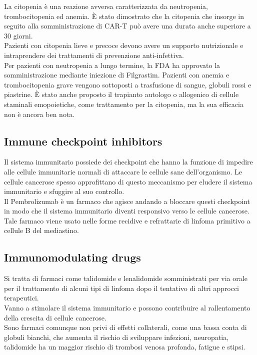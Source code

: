 La citopenia è una reazione avversa caratterizzata da neutropenia, trombocitopenia ed anemia. 
È stato dimostrato che la citopenia che insorge in seguito alla somministrazione di CAR-T può avere una durata anche 
superiore a 30 giorni\cite{Frontiers}.\\ 
Pazienti con citopenia lieve e precoce devono avere un supporto nutrizionale e intraprendere dei trattamenti di 
prevenzione anti-infettiva.\\ 
Per pazienti con neutropenia a lungo termine, la FDA ha approvato la somministrazione mediante iniezione di Filgrastim. 
Pazienti con anemia e trombocitopenia grave vengono sottoposti a trasfusione di sangue, globuli rossi e piastrine. 
È stato anche proposto il trapianto autologo o allogenico di cellule staminali emopoietiche, come trattamento per 
la citopenia, ma la sua efficacia non è ancora ben nota\cite{Frontiers}.\\

\subsection{Immune checkpoint inhibitors}

Il sistema immunitario possiede dei checkpoint che hanno la funzione di impedire alle cellule immunitarie normali di 
attaccare le cellule sane dell’organismo. Le cellule cancerose spesso approfittano di questo meccanismo per eludere il 
sistema immunitario e sfuggire al suo controllo.\\ 
Il Pembrolizumab è un farmaco che agisce andando a bloccare questi checkpoint in modo che il sistema immunitario 
diventi responsivo verso le cellule cancerose. Tale farmaco viene usato nelle forme recidive e refrattarie di linfoma 
primitivo a cellule B del mediastino\cite{IMMUNOTP}.\\

\subsection{Immunomodulating drugs}

Si tratta di farmaci come talidomide e lenalidomide somministrati per via orale per il trattamento di alcuni tipi di 
linfoma dopo il tentativo di altri approcci terapeutici\cite{MASSIVEBIO}.\\ 
Vanno a stimolare il sistema immunitario e possono contribuire al rallentamento della crescita di cellule cancerose.\\
Sono farmaci comunque non privi di effetti collaterali, come una bassa conta di globuli bianchi, che aumenta il 
rischio di sviluppare infezioni, neuropatia, talidomide ha un maggior rischio di trombosi venosa profonda, 
fatigue e stipsi\cite{IMMUNOTP}.\\

